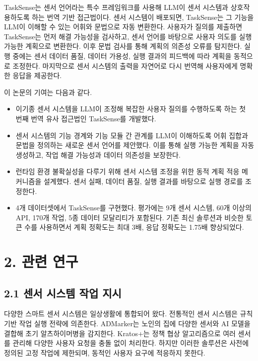 \documentclass[sigconf,nonacm]{acmart}
\begin{document}
TaskSense는 센서 언어라는 특수 프레임워크를 사용해 LLM이 센서 시스템과 상호작용하도록 하는 번역 기반 접근법이다. 센서 시스템이 배포되면, TaskSense는 그 기능을 LLM이 이해할 수 있는 어휘와 문법으로 자동 변환한다. 사용자가 질의를 제출하면 TaskSense는 먼저 해결 가능성을 검사하고, 센서 언어를 바탕으로 사용자 의도를 실행 가능한 계획으로 변환한다. 이후 문법 검사를 통해 계획의 의존성 오류를 탐지한다. 실행 중에는 센서 데이터 품질, 데이터 가용성, 실행 결과의 피드백에 따라 계획을 동적으로 조정한다. 마지막으로 센서 시스템의 출력을 자연어로 다시 번역해 사용자에게 명확한 응답을 제공한다.

이 논문의 기여는 다음과 같다.

\begin{itemize}
\item 이기종 센서 시스템을 LLM이 조정해 복잡한 사용자 질의를 수행하도록 하는 첫 번째 번역 유사 접근법인 TaskSense를 개발했다.
\item 센서 시스템의 기능 경계와 기능 모듈 간 관계를 LLM이 이해하도록 어휘 집합과 문법을 정의하는 새로운 센서 언어를 제안했다. 이를 통해 실행 가능한 계획을 자동 생성하고, 작업 해결 가능성과 데이터 의존성을 보장한다.
\item 런타임 환경 불확실성을 다루기 위해 센서 시스템 조정을 위한 동적 계획 적응 메커니즘을 설계했다. 센서 실패, 데이터 품질, 실행 결과를 바탕으로 실행 경로를 조정한다.
\item 4개 데이터셋에서 TaskSense를 구현했다. 평가에는 9개 센서 시스템, 60개 이상의 API, 170개 작업, 5종 데이터 모달리티가 포함된다. 기존 최신 솔루션과 비슷한 토큰 수를 사용하면서 계획 정확도는 최대 3배, 응답 정확도는 1.75배 향상되었다.
\end{itemize}


\section{2. 관련 연구}

\subsection{2.1 센서 시스템 작업 지시}

다양한 스마트 센서 시스템은 일상생활에 통합되어 왔다. 전통적인 센서 시스템은 규칙 기반 작업 실행 전략에 의존한다. ADMarker는 노인의 집에 다양한 센서와 AI 모델을 결합해 초기 알츠하이머병을 감지한다. Kratos+는 정책 협상 알고리즘으로 여러 센서를 관리해 다양한 사용자 요청을 충돌 없이 처리한다. 하지만 이러한 솔루션은 사전에 정의된 고정 작업에 제한되며, 동적인 사용자 요구에 적응하지 못한다.
\end{document}
